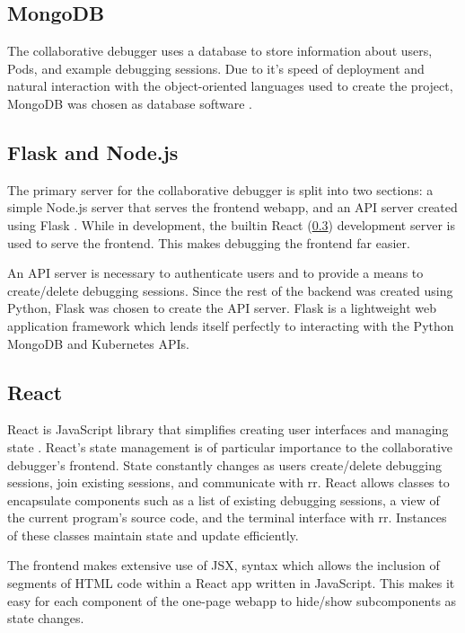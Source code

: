 \documentclass[12pt]{article}
\begin{document}
\subsection{MongoDB}\label{mongodb}

The collaborative debugger uses a database to store information about
users, Pods, and example debugging sessions.  Due to it's speed of
deployment and natural interaction with the object-oriented languages
used to create the project, MongoDB was chosen as database software
\cite{mongodb}.

\subsection{Flask and Node.js}\label{flask/node}

The primary server for the collaborative debugger is split into two
sections: a simple Node.js \cite{node} server that serves the frontend
webapp, and an API server created using Flask \cite{flask}.  While in
development, the builtin React (\ref{react}) development server
is used to serve the frontend.  This makes debugging the frontend far
easier.
\par

An API server is necessary to authenticate users and to provide a
means to create/delete debugging sessions.  Since the rest of the
backend was created using Python, Flask was chosen to create the API
server.  Flask is a lightweight web application framework which lends
itself perfectly to interacting with the Python MongoDB and Kubernetes
APIs.

\subsection{React}\label{react}

React is JavaScript library that simplifies creating user interfaces
and managing state \cite{react}.  React's state management is of
particular importance to the collaborative debugger's frontend.  State
constantly changes as users create/delete debugging sessions, join
existing sessions, and communicate with rr.  React allows classes to
encapsulate components such as a list of existing debugging sessions,
a view of the current program's source code, and the terminal
interface with rr.  Instances of these classes maintain state
and update efficiently.
\par
The frontend makes extensive use of JSX, syntax which allows the
inclusion of segments of HTML code within a React app written in
JavaScript.  This makes it easy for each component of the one-page
webapp to hide/show subcomponents as state changes.
\end{document}

